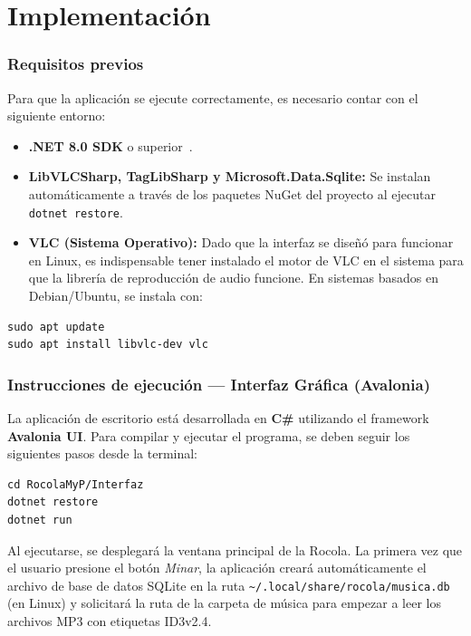 \documentclass{article}
\begin{document}
\section{Implementación}
\label{sec:implementacion}

\subsubsection{Requisitos previos}
Para que la aplicación se ejecute correctamente, es necesario contar con el siguiente entorno:
\begin{itemize}
    \item \textbf{.NET 8.0 SDK} o superior~\cite{dotnet}.
    \item \textbf{LibVLCSharp, TagLibSharp y Microsoft.Data.Sqlite:} Se instalan automáticamente a través de los paquetes NuGet del proyecto al ejecutar \texttt{dotnet restore}.
    \item \textbf{VLC (Sistema Operativo):} Dado que la interfaz se diseñó para funcionar en Linux, es indispensable tener instalado el motor de VLC en el sistema para que la librería de reproducción de audio funcione. En sistemas basados en Debian/Ubuntu, se instala con:
\end{itemize}

\begin{verbatim}
sudo apt update
sudo apt install libvlc-dev vlc
\end{verbatim}

\subsubsection{Instrucciones de ejecución — Interfaz Gráfica (Avalonia)}
La aplicación de escritorio está desarrollada en \textbf{C\#} utilizando el framework \textbf{Avalonia UI}. Para compilar y ejecutar el programa, se deben seguir los siguientes pasos desde la terminal:

\begin{verbatim}
cd RocolaMyP/Interfaz   
dotnet restore
dotnet run
\end{verbatim}

Al ejecutarse, se desplegará la ventana principal de la Rocola. La primera vez que el usuario presione el botón \textit{Minar}, la aplicación creará automáticamente el archivo de base de datos SQLite en la ruta \texttt{\textasciitilde/.local/share/rocola/musica.db} (en Linux) y solicitará la ruta de la carpeta de música para empezar a leer los archivos MP3 con etiquetas ID3v2.4.
\end{document}
